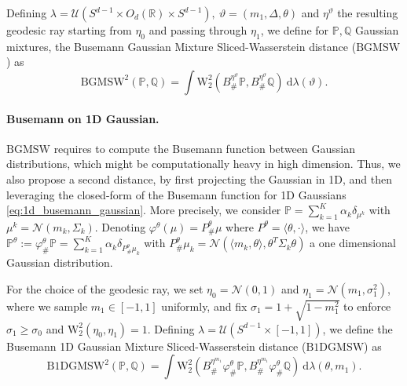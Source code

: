 \documentclass[twoside]{article}
\newcommand{\bP}{\mathbb{P}}
\newcommand{\bQ}{\mathbb{Q}}
\newcommand{\cN}{\mathcal{N}}
\newcommand{\cU}{\mathcal{U}}
\newcommand{\W}{\mathrm{W}}
\newcommand{\R}{\mathbb{R}}
\newcommand{\smwbg}{\mathrm{BGMSW}}
\newcommand{\smwbdg}{\mathrm{B1DGMSW}}
\begin{document}
Defining $\lambda = \cU(S^{d-1} \times O_d(\R) \times S^{d-1}), \ \vartheta=(m_1,\Delta,\theta)$ and $\eta^\vartheta$ the resulting geodesic ray starting from $\eta_0$ and passing through $\eta_1$, we define for $\bP,\bQ$ Gaussian mixtures, the Busemann Gaussian Mixture Sliced-Wasserstein distance ($\smwbg$) as
\begin{equation}
    \smwbg^2(\bP,\bQ) = \int \W_2^2(B^{\eta^{\vartheta}}_\#\bP, B^{\eta^{\vartheta}}_\#\bQ)\ \mathrm{d}\lambda(\vartheta).
\end{equation}


\paragraph{Busemann on 1D Gaussian.}

$\smwbg$ requires to compute the Busemann function between Gaussian distributions, which might be computationally heavy in high dimension. Thus, we also propose a second distance, by first projecting the Gaussian in 1D, and then leveraging the closed-form of the Busemann function for 1D Gaussians \eqref{eq:1d_busemann_gaussian}. More precisely, we consider $\bP=\sum_{k=1}^K \alpha_k \delta_{\mu^k}$ with $\mu^k=\cN(m_k,\Sigma_k)$. Denoting $\varphi^\theta(\mu)=P^\theta_\#\mu$ where $P^\theta=\langle \theta,\cdot\rangle$, we have $\bP^\theta:=\varphi^\theta_\#\bP = \sum_{k=1}^K \alpha_k\delta_{P^\theta_\#\mu_k}$ with $P^\theta_\#\mu_k = \cN(\langle m_k, \theta\rangle, \theta^T \Sigma_k \theta)$ a one dimensional Gaussian distribution. 

For the choice of the geodesic ray, we set $\eta_0=\cN(0,1)$ and $\eta_1=\cN(m_1,\sigma_1^2)$, where we sample $m_1\in [-1,1]$ uniformly, and fix $\sigma_1=1 + \sqrt{1-m_1^2}$ to enforce $\sigma_1\ge \sigma_0$ and $\W_2^2(\eta_0,\eta_1)=1$. Defining $\lambda = \cU(S^{d-1} \times [-1,1])$, we define the Busemann 1D Gaussian Mixture Sliced-Wasserstein distance ($\smwbdg$) as
\begin{equation}
    \smwbdg^2(\bP,\bQ) = \int \W_2^2(B^{\eta^{m_1}}_\#\varphi^\theta_\#\bP, B^{\eta^{m_1}}_\#\varphi^\theta_\#\bQ)\ \mathrm{d}\lambda(\theta, m_1).
\end{equation}
\end{document}
